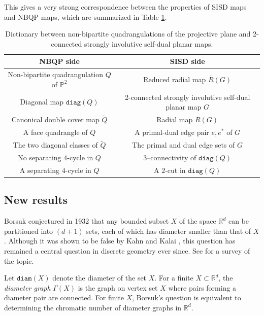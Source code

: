 \documentclass[10pt,a4paper]{article}
\renewcommand{\arraystretch}{1.5}
\newcounter{example}
\newcommand{\R}[0]{\mathbb{R}}
\newcommand{\Pb}[0]{\mathbb{P}}
\newcommand{\diam}[0]{\mathtt{diam}}
\newcommand{\diag}[0]{\mathtt{diag}}
\begin{document}
This gives a very strong correspondence between the properties of SISD maps and NBQP maps, which are summarized in Table \ref{tab:nbqp-sisd-dictionary}.


 \begin{table}[ht]
\centering
\renewcommand{\arraystretch}{1.25}
\begin{tabular}{c|c}
\textbf{NBQP side} & \textbf{SISD side} \\
\hline
Non-bipartite quadrangulation $Q$ of $\Pb^2$
&
Reduced radial map $\overline R(G)$
\\
Diagonal map  $\diag(Q)$
&
2-connected strongly involutive self-dual planar map $G$
\\

Canonical double cover map $\widetilde Q$
&
Radial map $R(G)$
\\

A face quadrangle of $Q$
&
A primal-dual edge pair $e,e^*$ of $G$
\\

The two diagonal classes of $\widetilde Q$
&
The primal and dual edge sets of $G$
\\

No separating $4$-cycle in $Q$
&
3--connectivity of $\diag(Q)$
\\

A separating $4$-cycle in $Q$
&
A $2$-cut in $\diag(Q)$
\\

\end{tabular}
\caption{Dictionary between non-bipartite quadrangulations of the projective plane and 2-connected strongly involutive self-dual planar maps.}
\label{tab:nbqp-sisd-dictionary}
\end{table}
 



\subsection{New results}
Borsuk conjectured in 1932 that any bounded subset $X$ of the space $\R^d$ can be partitioned into $(d + 1)$ sets, each of which has diameter smaller than that of $X$ \cite{borsuk1933drei}. Although it was shown to be false by Kahn and Kalai \cite{kahn1993counterexample}, this question has remained a central question in discrete geometry ever since. See \cite{Kalai_2015} for a survey of the topic. 

Let $\diam(X)$ denote the diameter of the set $X$. For a finite $X\subset \R^d$, the \emph{diameter graph} $\Gamma(X)$ is the graph on vertex set $X$ where pairs forming a diameter pair are connected. For finite $X$, Borsuk's question is equivalent to determining the chromatic number of diameter graphs in $\R^d$. 
\end{document}

